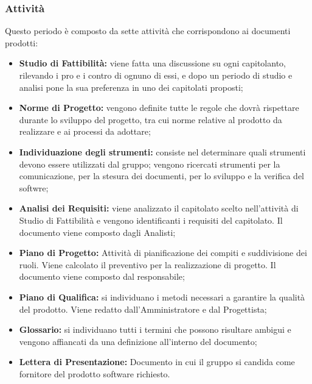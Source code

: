 \subsubsection{Attività}
Questo periodo è composto da sette attività che corrispondono ai documenti prodotti:
\begin{itemize}
	\item \textbf{Studio di Fattibilità:} viene fatta una discussione su ogni capitolanto, rilevando i pro e i contro di ognuno di essi, e dopo un periodo di studio e analisi \Gruppo pone la sua preferenza in uno dei capitolati proposti;
	\item \textbf{Norme di Progetto:} vengono definite tutte le regole che \Gruppo dovrà rispettare durante lo sviluppo del progetto, tra cui norme relative al prodotto da realizzare e ai processi da adottare;
	\item \textbf{Individuazione degli strumenti:} consiste nel determinare quali strumenti devono essere utilizzati dal gruppo; vengono ricercati strumenti per la comunicazione, per la stesura dei documenti, per lo sviluppo e la verifica del softwre;
	\item \textbf{Analisi dei Requisiti:} viene analizzato il capitolato scelto nell'attività di Studio di Fattibilità e vengono identificanti i requisiti del capitolato. Il documento viene composto dagli Analisti;
	\item \textbf{Piano di Progetto:} Attività di pianificazione dei compiti e suddivisione dei ruoli. Viene calcolato il preventivo per la realizzazione di progetto. Il documento viene composto dal responsabile;
	\item \textbf{Piano di Qualifica:} si individuano i metodi necessari a garantire la qualità del prodotto. Viene redatto dall'Amministratore e dal Progettista;
	\item\textbf{Glossario:} si individuano tutti i termini che possono risultare ambigui e vengono affiancati da una definizione all'interno del documento;  
	\item \textbf{Lettera di Presentazione:} Documento in cui il gruppo \Gruppo si candida come fornitore del prodotto software richiesto.
\end{itemize}
